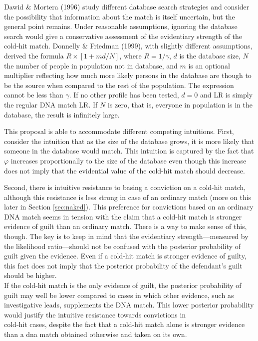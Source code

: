 \documentclass[10pt,dvipsnames,enabledeprecatedfontcommands]{scrartcl}
\begin{document}
Dawid \& Mortera (1996) study different database search strategies and
consider the possibility that information about the match is itself
uncertain, but the general point remains. Under reasonable assumptions,
ignoring the database search would give a conservative assessment of the
evidentiary strength of the cold-hit match. Donnelly \& Friedman (1999),
with slightly different assumptions, derived the formula
\(R \times [1+md/N]\), where \(R = 1/\gamma\), \(d\) is the database
size, \(N\) the number of people in population not in database, and
\(m\) is an optional multiplier reflecting how much more likely persons
in the database are though to be the source when compared to the rest of
the population. The expression cannot be less than \(\gamma\). If no
other profile has been tested, \(d=0\) and LR is simply the regular DNA
match LR. If \(N\) is zero, that is, everyone in population is in the
database, the result is infinitely large.

This proposal is able to accommodate different competing intuitions.
First, consider the intuition that as the size of the database grows, it
is more likely that someone in the database would match. This intuition
is captured by the fact that \(\varphi\) increases proportionally to the
size of the database even though this increase does not imply that the
evidential value of the cold-hit match should decrease.

Second, there is intuitive resistance to basing a conviction on a
cold-hit match, although this resistance is less strong in case of an
ordinary match (more on this later in Section
\ref{sec:naked}). This preference for
convictions based on an ordinary DNA match seems in tension with the
claim that a cold-hit match is stronger evidence of guilt than an
ordinary match. There is a way to make sense of this, though. The key is
to keep in mind that the evidentiary strength---measured by the
likelihood ratio---should not be confused with the posterior probability
of guilt given the evidence. Even if a cold-hit match is stronger
evidence of guilty, this fact does not imply that the posterior
probability of the defendant's guilt should be higher.\\
If the cold-hit match is the only evidence of guilt, the posterior
probability of guilt may well be lower compared to cases in which other
evidence, such as investigative leads, supplements the DNA match. This
lower posterior probability would justify the intuitive resistance
towards convictions in\\
cold-hit cases, despite the fact that a cold-hit match alone is stronger
evidence than a dna match obtained otherwise and taken on its own.
\end{document}
